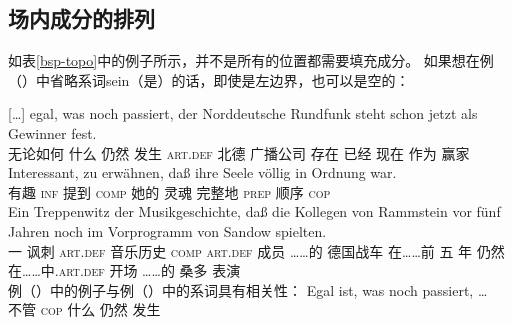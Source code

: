 \pagebreak
\subsection{场内成分的排列}

如表\ref{bsp-topo}中的例子所示，并不是所有的位置都需要填充成分。
如果想在例（）中省略系词sein（是）的话，即使是左边界，也可以是空的：
\eal
\ex

{}[\ldots]
\gll egal,      was  noch  passiert, der Norddeutsche Rundfunk             steht  schon   jetzt als Gewinner fest.\footnotemark\\
     无论如何 什么 仍然 发生 \textsc{art}.\textsc{def} 北德 广播公司 存在 已经 现在 作为 赢家 \particle\\
\ex 
\gll Interessant, zu erwähnen, daß ihre Seele völlig    in Ordnung war.\footnotemark\\
	 有趣 \textsc{inf} 提到 \textsc{comp} 她的 灵魂 完整地 \textsc{prep} 顺序 \textsc{cop}\\
\ex
\gll Ein Treppenwitz der    Musikgeschichte, daß die Kollegen   von Rammstein vor    fünf Jahren noch im      Vorprogramm   von Sandow spielten.\footnotemark\\
	 一 讽刺 \textsc{art}.\textsc{def} 音乐历史 \textsc{comp} \textsc{art}.\textsc{def} 成员 ……的 德国战车 在……前 五 年 仍然 在……中.\textsc{art}.\textsc{def} 开场 ……的 桑多 表演\\
\zl
例（）中的例子与例（）中的系词具有相关性：
\eal
\ex 
\gll Egal ist, was noch passiert, \ldots\\
     不管 \textsc{cop}	 什么 仍然 发生 \\
